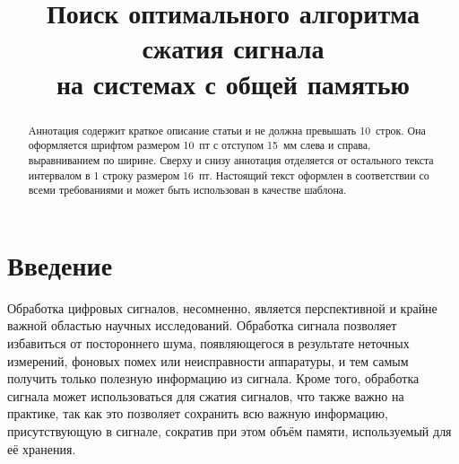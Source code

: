 \documentclass[11pt, oneside, a4paper]{article}
\begin{document}

\title{Поиск оптимального алгоритма сжатия сигнала\\на системах с общей памятью}


\begin{abstract}
Аннотация содержит краткое описание статьи и не должна превышать
10~строк. Она оформляется шрифтом размером 10~пт с отступом 15~мм слева
и справа, выравниванием по ширине. Сверху и снизу аннотация отделяется
от остального текста интервалом в 1 строку размером 16~пт. Настоящий
текст оформлен в соответствии со всеми требованиями и может быть
использован в качестве шаблона.
\end{abstract}



\section{Введение}

Обработка цифровых сигналов, несомненно, является перспективной и крайне важной областью научных исследований. Обработка сигнала позволяет избавиться от постороннего шума, появляющегося в результате неточных измерений, фоновых помех или неисправности аппаратуры, и тем самым получить только полезную информацию из сигнала. Кроме того, обработка сигнала может использоваться для сжатия сигналов, что также важно на практике, так как это позволяет сохранить всю важную информацию, присутствующую в сигнале, сократив при этом объём памяти, используемый для её хранения. 
\end{document}
